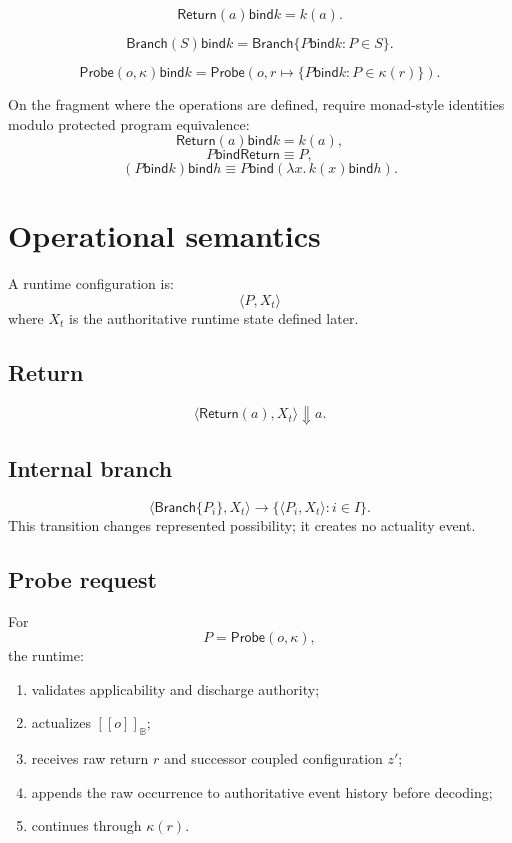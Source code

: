 \documentclass[11pt,oneside]{article}
\newcommand{\B}{\mathbb B}
\newcommand{\den}[1]{[\![#1]\!]}
\newcommand{\bind}{\mathbin{\mathsf{bind}}}
\begin{document}
\[
\boxed{
\mathsf{Return}(a)\bind k
=
k(a).
}
\]

\[
\boxed{
\mathsf{Branch}(S)\bind k
=
\mathsf{Branch}\{P\bind k:P\in S\}.
}
\]

\[
\boxed{
\mathsf{Probe}(o,\kappa)\bind k
=
\mathsf{Probe}
\left(
o,
r\mapsto
\{P\bind k:P\in\kappa(r)\}
\right).
}
\]

On the fragment where the operations are defined, require monad-style identities modulo protected program equivalence:
\[
\mathsf{Return}(a)\bind k=k(a),
\]
\[
P\bind\mathsf{Return}\equiv P,
\]
\[
(P\bind k)\bind h
\equiv
P\bind(\lambda x.\,k(x)\bind h).
\]

\section{Operational semantics}

A runtime configuration is:
\[
\boxed{
\langle P,X_t\rangle
}
\]
where \(X_t\) is the authoritative runtime state defined later.

\subsection{Return}

\[
\langle\mathsf{Return}(a),X_t\rangle
\Downarrow a.
\]

\subsection{Internal branch}

\[
\langle\mathsf{Branch}\{P_i\},X_t\rangle
\longrightarrow
\{\langle P_i,X_t\rangle:i\in I\}.
\]
This transition changes represented possibility; it creates no actuality event.

\subsection{Probe request}

For
\[
P=\mathsf{Probe}(o,\kappa),
\]
the runtime:
\begin{enumerate}
\item validates applicability and discharge authority;
\item actualizes \(\den{o}_{\B}\);
\item receives raw return \(r\) and successor coupled configuration \(z'\);
\item appends the raw occurrence to authoritative event history before decoding;
\item continues through \(\kappa(r)\).
\end{enumerate}
\end{document}

